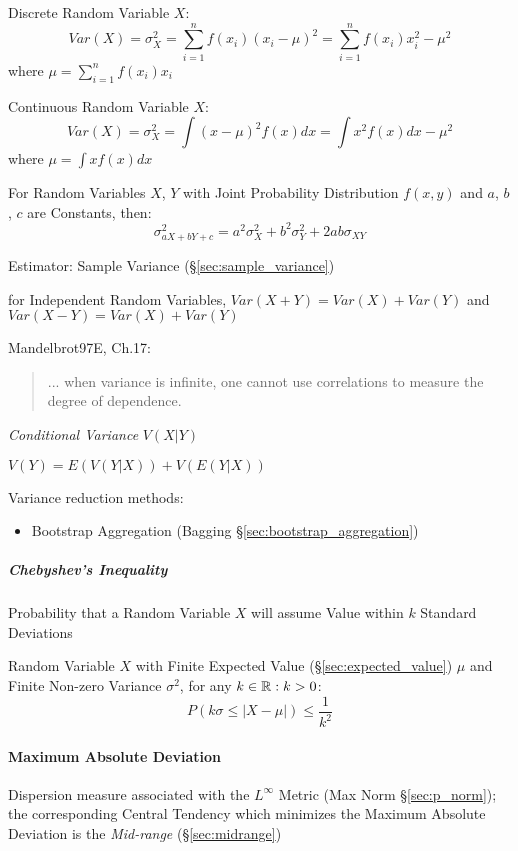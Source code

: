 Discrete Random Variable $X$:
\[
  Var(X) = \sigma_X^2 = \sum_{i=1}^n f(x_i) (x_i - \mu)^2 = \sum_{i=1}^n
  f(x_i) x_i^2 - \mu^2
\]
where $\mu = \sum_{i=1}^n f(x_i) x_i$

Continuous Random Variable $X$:
\[
  Var(X) = \sigma_X^2 = \int (x - \mu)^2 f(x) dx = \int x^2 f(x) dx -
  \mu^2
\]
where $\mu = \int x f(x) dx$

For Random Variables $X$, $Y$ with Joint Probability Distribution
$f(x,y)$ and $a$, $b$, $c$ are Constants, then:
\[
  \sigma^2_{a X + b Y + c} = a^2 \sigma^2_X + b^2 \sigma^2_Y + 2ab
  \sigma_{X Y}
\]

\fist Estimator: Sample Variance (\S\ref{sec:sample_variance})

for Independent Random Variables, $Var(X + Y) = Var(X) + Var(Y)$ and
$Var(X - Y) = Var(X) + Var(Y)$

Mandelbrot97E, Ch.17:
\begin{quote}
  ... when variance is infinite, one cannot use correlations to measure the
  degree of dependence.
\end{quote}

\emph{Conditional Variance} $V(X|Y)$

$V(Y) = E(V(Y|X)) + V(E(Y|X))$

Variance reduction methods:
\begin{itemize}
  \item Bootstrap Aggregation (Bagging \S\ref{sec:bootstrap_aggregation})
\end{itemize}



\subparagraph{Chebyshev's Inequality}\label{sec:chebyshevs_inequality}\hfill

Probability that a Random Variable $X$ will assume Value within $k$ Standard
Deviations

Random Variable $X$ with Finite Expected Value (\S\ref{sec:expected_value})
$\mu$ and Finite Non-zero Variance $\sigma^2$, for any $k \in \mathbb{R} : k > 0$:
\[
  P(k\sigma \leq |X - \mu|) \leq \frac{1}{k^2}
\]



\paragraph{Maximum Absolute Deviation}
\label{sec:maximum_absolute_deviation}\hfill

Dispersion measure associated with the $L^\infty$ Metric (Max Norm
\S\ref{sec:p_norm}); the corresponding Central Tendency which minimizes the
Maximum Absolute Deviation is the \emph{Mid-range} (\S\ref{sec:midrange})



